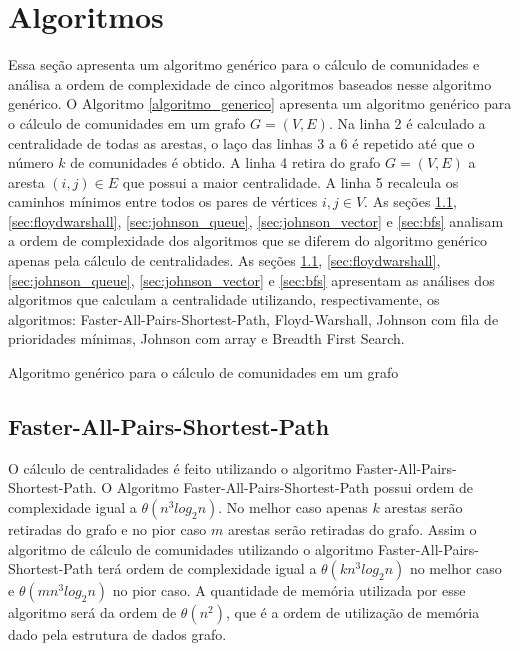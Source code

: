 \section{Algoritmos}\label{sec:algoritmos} 
Essa seção apresenta um algoritmo genérico para o cálculo de comunidades e análisa a ordem de complexidade de cinco algoritmos baseados nesse algoritmo genérico.
O Algoritmo \ref{algoritmo_generico} apresenta um algoritmo genérico para o cálculo de comunidades em um grafo $G = (V, E)$.
Na linha 2 é calculado a centralidade de todas as arestas, o laço das linhas 3 a 6 é repetido até que o número $k$ de comunidades
é obtido. A linha 4 retira do grafo $G = (V, E)$ a aresta $(i, j) \in E$ que possui a maior centralidade. A linha 5 recalcula os
caminhos mínimos entre todos os pares de vértices $i, j \in V$.
As seções \ref{sec:faster}, \ref{sec:floydwarshall}, \ref{sec:johnson_queue}, \ref{sec:johnson_vector} e \ref{sec:bfs} 
analisam a ordem de complexidade dos algoritmos que se diferem do algoritmo genérico apenas pela cálculo de centralidades. As seções 
\ref{sec:faster}, \ref{sec:floydwarshall}, \ref{sec:johnson_queue}, \ref{sec:johnson_vector} e \ref{sec:bfs} 
apresentam as análises dos algoritmos que calculam a centralidade utilizando, respectivamente, os algoritmos: Faster-All-Pairs-Shortest-Path, Floyd-Warshall, Johnson com fila de prioridades mínimas, Johnson com array e Breadth First Search.

\begin{algorithm}
\caption{Algoritmo genérico para o cálculo de comunidades em um grafo}
\label{algoritmo_generico}
\end{algorithm}

\subsection{Faster-All-Pairs-Shortest-Path}\label{sec:faster}
O cálculo de centralidades é feito utilizando o algoritmo Faster-All-Pairs-Shortest-Path. O Algoritmo Faster-All-Pairs-Shortest-Path
possui ordem de complexidade igual a $\theta(n^3log_2n)$. No melhor caso apenas $k$ arestas serão retiradas do grafo e no pior
caso $m$ arestas serão retiradas do grafo. Assim o algoritmo de cálculo de comunidades utilizando o algoritmo Faster-All-Pairs-Shortest-Path terá ordem de complexidade igual a $\theta(kn^3log_2n)$ no melhor caso e $\theta(mn^3log_2n)$ no pior caso. A quantidade
de memória utilizada por esse algoritmo será da ordem de $\theta(n^2)$, que é a ordem de utilização de memória dado pela estrutura
de dados grafo.

